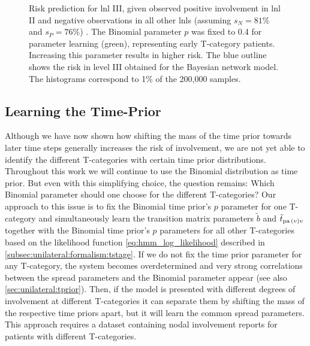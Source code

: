 \documentclass[\relativeRoot/main.tex]{subfiles}
\begin{document}
\begin{figure}
    \centering
    \def\svgwidth{0.7\textwidth}
    
    \caption[Change of predicted risk for ipsilateral LNL III involvement as binomial parameter increases]{Risk prediction for \gls{lnl} III, given observed positive involvement in \gls{lnl} II and negative observations in all other \glspl{lnl} (assuming $s_N = 81\%$ and $s_P = 76\%$) \cite{de_bondt_detection_2007}. The Binomial parameter $p$ was fixed to 0.4 for parameter learning (green), representing early T-category patients. Increasing this parameter results in higher risk. The blue outline shows the risk in level III obtained for the Bayesian network model. The histograms correspond to 1\% of the 200,000 samples.}
    \label{fig:unilateral:hmm_risk_increase}
\end{figure}

\subsection{Learning the Time-Prior}
\label{subsec:unilateral:application:tprior}

Although we have now shown how shifting the mass of the time prior towards later time steps generally increases the risk of involvement, we are not yet able to identify the different T-categories with certain time prior distributions. Throughout this work we will continue to use the Binomial distribution as time prior. But even with this simplifying choice, the question remains: Which Binomial parameter should one choose for the different T-categories? Our approach to this issue is to fix the Binomial time prior's $p$ parameter for one T-category and simultaneously learn the transition matrix parameters $\tilde{b}$ and $\tilde{t}_{\operatorname{pa}{(v)}v}$ together with the Binomial time prior's $p$ parameters for all other T-categories based on the likelihood function \cref{eq:hmm_log_likelihood} described in \cref{subsec:unilateral:formalism:tstage}. If we do not fix the time prior parameter for any T-category, the system becomes overdetermined and very strong correlations between the spread parameters and the Binomial parameter appear (see also \cref{sec:unilateral:tprior}). Then, if the model is presented with different degrees of involvement at different T-categories it can separate them by shifting the mass of the respective time priors apart, but it will learn the common spread parameters. This approach requires a dataset containing nodal involvement reports for patients with different T-categories.
\end{document}
